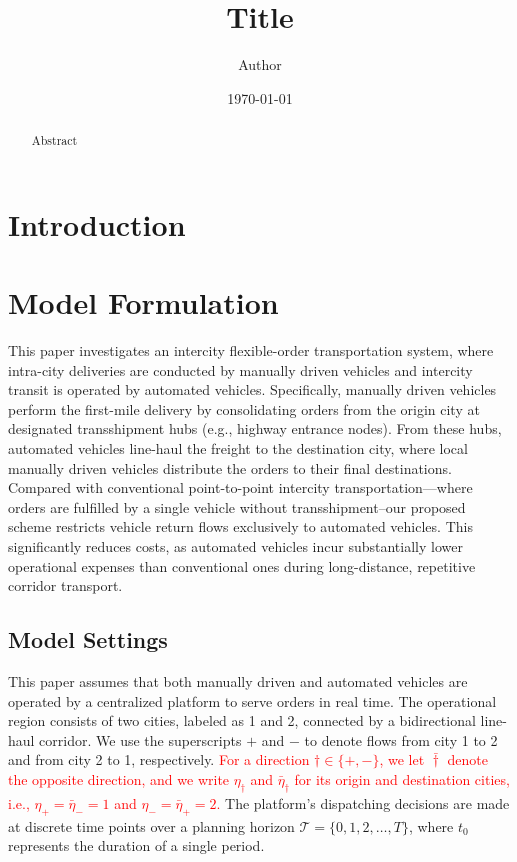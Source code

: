 \documentclass[10pt, reqno]{amsart}
\begin{document}
\title{Title} %
\author[Initial Surname]{Author}
\date{\today}
\address{Address}
\maketitle

\let\thefootnote\relax
{} %

\begin{abstract}
Abstract 
\end{abstract} %

\bigskip
\section{Introduction}

\section{Model Formulation}
This paper investigates an intercity flexible-order transportation system, where intra-city deliveries are conducted by manually driven vehicles and intercity transit is operated by automated vehicles. Specifically, manually driven vehicles perform the first-mile delivery by consolidating orders from the origin city at designated transshipment hubs (e.g., highway entrance nodes). From these hubs, automated vehicles line-haul the freight to the destination city, where local manually driven vehicles distribute the orders to their final destinations. Compared with conventional point-to-point intercity transportation—where orders are fulfilled by a single vehicle without transshipment--our proposed scheme restricts vehicle return flows exclusively to automated vehicles. This significantly reduces costs, as automated vehicles incur substantially lower operational expenses than conventional ones during long-distance, repetitive corridor transport. 

\subsection{Model Settings} \label{subsec:settings}

This paper assumes that both manually driven and automated vehicles are operated by a centralized platform to serve orders in real time. The operational region consists of two cities, labeled as 1 and 2, connected by a bidirectional line-haul corridor. We use the superscripts $+$ and $-$ to denote flows from city 1 to 2 and from city 2 to 1, respectively. \textcolor{red}{For a direction $\dagger\in\{+,-\}$, we let $\bar{\dagger}$ denote the opposite direction, and we write $\eta_{\dagger}$ and $\bar{\eta}_{\dagger}$ for its origin and destination cities, i.e., $\eta_{+}=\bar{\eta}_{-}=1$ and $\eta_{-}=\bar{\eta}_{+}=2$.} The platform's dispatching decisions are made at discrete time points over a planning horizon $\mathcal{T} = \{0, 1, 2, \dots, T\}$, where $t_0$ represents the duration of a single period.
\end{document}
